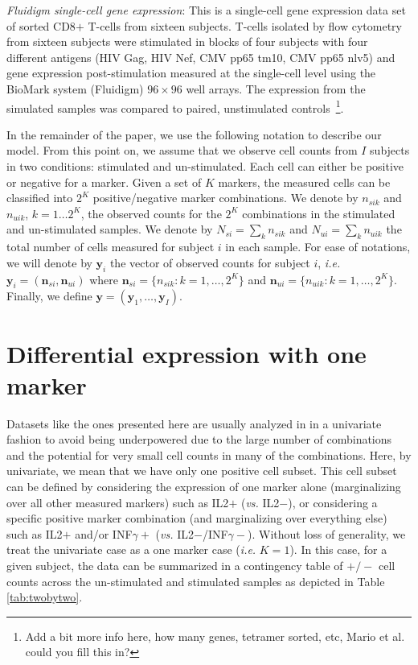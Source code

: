 \documentclass[useAMS,referee,usenatbib]{biom}
\begin{document}
\textit{Fluidigm single-cell gene expression}: This is a single-cell gene expression data set of sorted CD8$+$ T-cells from sixteen subjects. T-cells isolated by flow cytometry from sixteen subjects were stimulated in blocks of four subjects with four different antigens (HIV Gag, HIV Nef, CMV pp65 tm10, CMV pp65 nlv5) and gene expression post-stimulation measured at the single-cell level using the BioMark system (Fluidigm) $96 \times 96$ well arrays. The expression from the simulated samples  was compared to paired, unstimulated controls~\footnote{Add a bit more info here, how many genes, tetramer sorted, etc, Mario et al. could you fill this in?}.


In the remainder of the paper, we use the following notation to describe our model.  From this point on, we assume that we observe cell counts from $I$ subjects in two conditions: stimulated and un-stimulated. Each cell can either be positive or negative for a marker. Given a set of $K$ markers, the measured cells can be classified into $2^K$ positive/negative marker combinations. We denote by $n_{sik}$ and $n_{uik}$, $k=1\dots 2^K$, the observed counts for the $2^K$ combinations in the stimulated and un-stimulated samples. We denote by $N_{si}=\sum_k n_{sik}$ and $N_{ui}=\sum_k n_{uik}$ the total number of cells measured for subject $i$ in each sample. For ease of notations, we will denote by $\mathbf{y}_i$ the vector of observed counts for subject $i$, \textit{i.e.} $\mathbf{y}_{i}=(\mathbf{n}_{si}, \mathbf{n}_{ui})$ where $\mathbf{n}_{si}=\{n_{sik}: k=1,\dots,2^K\}$ and $\mathbf{n}_{ui}=\{n_{uik}: k=1,\dots,2^K\}$. Finally, we define $\mathbf{y}=(\mathbf{y}_1,\dots,\mathbf{y}_I)$.

\section{Differential expression with one marker}
\label{s:DEone}
Datasets like the ones presented here are usually analyzed in in a univariate fashion to avoid being underpowered due to the large number of combinations and the potential for very small cell counts in many of the combinations. Here, by univariate, we mean that we have only one positive cell subset. This cell subset can be defined by considering the expression of one marker alone (marginalizing over all other measured markers) such as IL2$+$ (\textit{vs.} IL2$-$), or considering a specific positive marker combination (and marginalizing over everything else) such as IL2$+$ and/or INF$\gamma+$ (\textit{vs.} IL2$-$/INF$\gamma-$). Without loss of generality, we treat the univariate case as a one marker case (\textit{i.e.} $K=1$). In this case, for a given subject, the data can be summarized in a contingency table of $+/-$ cell counts across the un-stimulated and stimulated samples as depicted in Table \ref{tab:twobytwo}.
\end{document}
